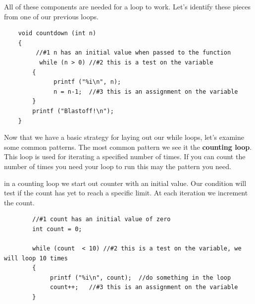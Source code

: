 All of these components are needed for a loop to work. Let's identify these pieces from one of our previous loops. 

\begin{verbatim}
	void countdown (int n) 
	{
		 //#1 n has an initial value when passed to the function
		  while (n > 0) //#2 this is a test on the variable
	 	{
		 	  printf ("%i\n", n);
		 	  n = n-1;  //#3 this is an assignment on the variable
	 	}
	 	printf ("Blastoff!\n");
	}
\end{verbatim}
%
Now that we have a basic strategy for laying out our while loops, let's examine some common patterns. The most common pattern we see it the {\bf counting loop}. This loop is used for iterating a specified number of times. If you can count the number of times you need your loop to run this may the pattern you need.

in a counting loop we start out counter with an initial value. Our condition will test if the count has yet to reach a specific limit. At each iteration we increment the count. 
\begin{verbatim}
		//#1 count has an initial value of zero
		int count = 0;
		
		while (count  < 10) //#2 this is a test on the variable, we will loop 10 times
		{
			 printf ("%i\n", count);  //do something in the loop
			 count++;   //#3 this is an assignment on the variable
		}
\end{verbatim}
%

